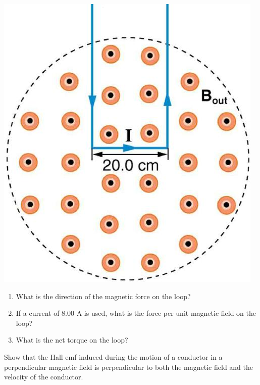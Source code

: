 \documentclass[9pt,addpoints]{exam}
\begin{document}
\begin{questions}
\begin{center}
			\includegraphics[scale=0.3]{loop1}
		\end{center}
		\begin{enumerate}[label=(\roman*)]
			\item What is the direction of the magnetic force on the loop? 
			\item If a current of 8.00 A is used, what is the force per unit magnetic field on the loop?
			\item What is the net torque on the loop?
		\end{enumerate}
		\question Show that the Hall emf induced during the motion of a conductor in a perpendicular magnetic field is perpendicular to both the magnetic field and the velocity of the conductor.

\end{questions}
\end{document}
